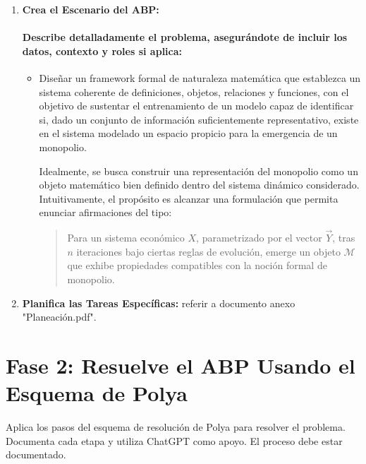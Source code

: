 \documentclass[a4paper,12pt]{article}
\begin{document}
\begin{enumerate}
\begin{enumerate}
    \end{enumerate}
    \item \textbf{Crea el Escenario del ABP:}
    \paragraph{Describe detalladamente el problema, asegurándote de incluir los datos, contexto y roles si aplica:}
    \begin{itemize}
        \item Diseñar un framework formal de naturaleza matemática que establezca un sistema coherente de definiciones, objetos, relaciones y funciones, con el objetivo de sustentar el entrenamiento de un modelo capaz de identificar si, dado un conjunto de información suficientemente representativo, existe en el sistema modelado un espacio propicio para la emergencia de un monopolio.

Idealmente, se busca construir una representación del monopolio como un objeto matemático bien definido dentro del sistema dinámico considerado. Intuitivamente, el propósito es alcanzar una formulación que permita enunciar afirmaciones del tipo:
\begin{quote}
    Para un sistema económico \( X \), parametrizado por el vector \( \vec{Y} \), tras \( n \) iteraciones bajo ciertas reglas de evolución, emerge un objeto \( \mathcal{M} \) que exhibe propiedades compatibles con la noción formal de monopolio.
\end{quote}


    \end{itemize}

    \item \textbf{Planifica las Tareas Específicas:} referir a documento anexo "Planeación.pdf".

\end{enumerate}




\section*{Fase 2: Resuelve el ABP Usando el Esquema de Polya}

Aplica los pasos del esquema de resolución de Polya para resolver el problema. Documenta cada etapa y utiliza ChatGPT como apoyo. El proceso debe estar documentado. 
\end{document}
